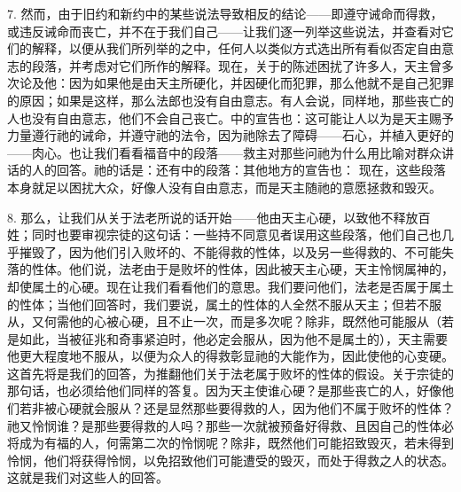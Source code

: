 7. 然而，由于旧约和新约中的某些说法导致相反的结论——即遵守诫命而得救，或违反诫命而丧亡，并不在于我们自己——让我们逐一列举这些说法，并查看对它们的解释，以便从我们所列举的之中，任何人以类似方式选出所有看似否定自由意志的段落，并考虑对它们所作的解释。现在，关于的陈述困扰了许多人，天主曾多次论及他：因为如果他是由天主所硬化，并因硬化而犯罪，那么他就不是自己犯罪的原因；如果是这样，那么法郎也没有自由意志。有人会说，同样地，那些丧亡的人也没有自由意志，他们不会自己丧亡。中的宣告也：这可能让人以为是天主赐予力量遵行祂的诫命，并遵守祂的法令，因为祂除去了障碍——石心，并植入更好的——肉心。也让我们看看福音中的段落——救主对那些问祂为什么用比喻对群众讲话的人的回答。祂的话是：还有中的段落：其他地方的宣告也：   现在，这些段落本身就足以困扰大众，好像人没有自由意志，而是天主随祂的意愿拯救和毁灭。\par

8. 那么，让我们从关于法老所说的话开始——他由天主心硬，以致他不释放百姓；同时也要审视宗徒的这句话：一些持不同意见者误用这些段落，他们自己也几乎摧毁了，因为他们引入败坏的、不能得救的性体，以及另一些得救的、不可能失落的性体。他们说，法老由于是败坏的性体，因此被天主心硬，天主怜悯属神的，却使属土的心硬。现在让我们看看他们的意思。我们要问他们，法老是否属于属土的性体；当他们回答时，我们要说，属土的性体的人全然不服从天主；但若不服从，又何需他的心被心硬，且不止一次，而是多次呢？除非，既然他可能服从（若是如此，当被征兆和奇事紧迫时，他必定会服从，因为他不是属土的），天主需要他更大程度地不服从，以便为众人的得救彰显祂的大能作为，因此使他的心变硬。这首先将是我们的回答，为推翻他们关于法老属于败坏的性体的假设。关于宗徒的那句话，也必须给他们同样的答复。因为天主使谁心硬？是那些丧亡的人，好像他们若非被心硬就会服从？还是显然那些要得救的人，因为他们不属于败坏的性体？祂又怜悯谁？是那些要得救的人吗？那些一次就被预备好得救、且因自己的性体必将成为有福的人，何需第二次的怜悯呢？除非，既然他们可能招致毁灭，若未得到怜悯，他们将获得怜悯，以免招致他们可能遭受的毁灭，而处于得救之人的状态。这就是我们对这些人的回答。\par

